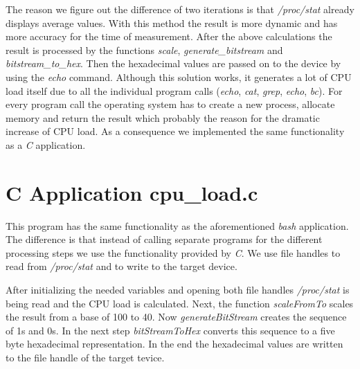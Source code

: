 The reason we figure out the difference of two iterations is that \textit{/proc/stat} already displays average values. With this method the result is more dynamic and has more accuracy for the time of measurement. After the above calculations the result is processed by the functions \textit{scale}, \textit{generate\_bitstream} and \textit{bitstream\_to\_hex}. Then the hexadecimal values are passed on to the device by using the \textit{echo} command. Although this solution works, it generates a lot of CPU load itself due to all the individual program calls (\textit{echo}, \textit{cat}, \textit{grep}, \textit{echo}, \textit{bc}). For every program call the operating system has to create a new process, allocate memory and return the result which probably the reason for the dramatic increase of CPU load. As a consequence we implemented the same functionality as a \textit{C} application.



\section{C Application cpu\_load.c}

This program has the same functionality as the aforementioned \textit{bash} application. The difference is that instead of calling separate programs for the different processing steps we use the functionality provided by \textit{C}. We use file handles to read from \textit{/proc/stat} and to write to the target device. 

After initializing the needed variables and opening both file handles \textit{/proc/stat} is being read and the CPU load is calculated. Next, the function \textit{scaleFromTo} scales the result from a base of 100 to 40. Now \textit{generateBitStream} creates the sequence of 1s and 0s. In the next step \textit{bitStreamToHex} converts this sequence to a five byte hexadecimal representation. In the end the hexadecimal values are written to the file handle of the target tevice.
